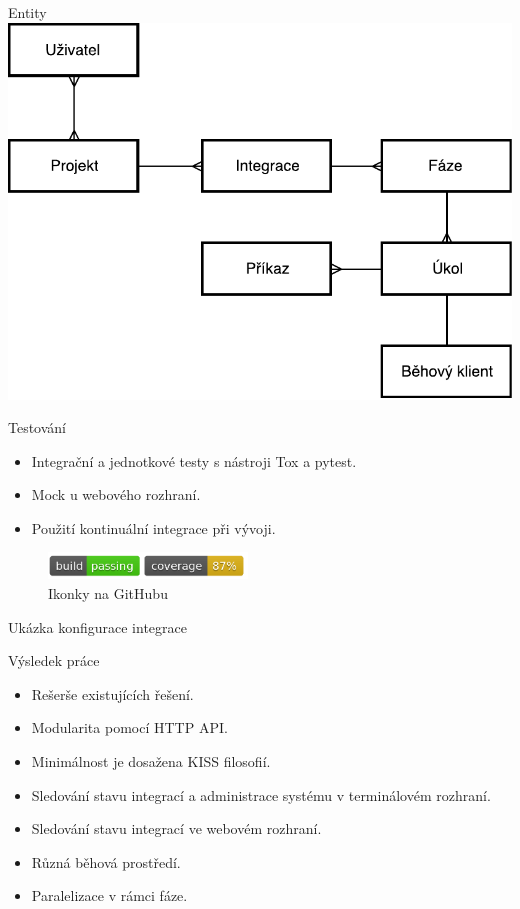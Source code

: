 \documentclass{beamer}
\begin{document}
\begin{frame}{Entity}
	\hfill
	\includegraphics[height=.8\paperheight]{img/entity_piper.pdf}
	\hfill
\end{frame}

\begin{frame}{Testování}
\begin{itemize}
	\item Integrační a jednotkové testy s nástroji Tox a pytest.
	\item Mock u webového rozhraní.
	\item Použití kontinuální integrace při vývoji.
\end{itemize}
\begin{figure}
\includegraphics[width=150pt]{img/piper-ci-badges.png}
\caption{Ikonky na GitHubu}
\end{figure}
\end{frame}

\begin{frame}{Ukázka konfigurace integrace}
	\exampleCode{}
\end{frame}

\begin{frame}{Výsledek práce}
\begin{itemize}
	\item Rešerše existujících řešení.
	\item Modularita pomocí HTTP API.
	\item Minimálnost je dosažena KISS filosofií.
	\item Sledování stavu integrací a administrace systému v terminálovém rozhraní.
	\item Sledování stavu integrací ve webovém rozhraní.
	\item Různá běhová prostředí.
	\item Paralelizace v rámci fáze.
\end{itemize}
\end{frame}
\end{document}
